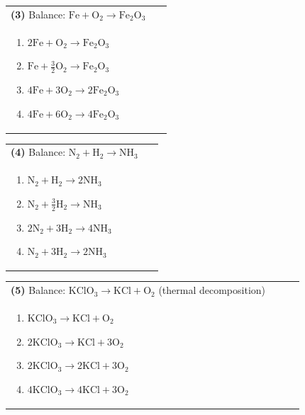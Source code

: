 \documentclass{article}
\begin{document}
\vspace{0.2cm}
\noindent \begin{tabular}{|p{0.9\linewidth}|}
\hline
\vspace{0.2cm}
\textbf{(3)} Balance: \(\mathrm{Fe + O_2 \rightarrow Fe_2O_3}\)\\
\begin{minipage}[t]{0.85\linewidth}
\begin{enumerate}[label=\alph*.]
   \item \(\mathrm{2Fe + O_2 \rightarrow Fe_2O_3}\)
   \item \(\mathrm{Fe + \tfrac{3}{2}O_2 \rightarrow Fe_2O_3}\)
   \item \(\mathrm{4Fe + 3O_2 \rightarrow 2Fe_2O_3}\)
   \item \(\mathrm{4Fe + 6O_2 \rightarrow 4Fe_2O_3}\)
\end{enumerate}
\end{minipage}\\
\hline
\end{tabular}

\vspace{0.2cm}
\noindent \begin{tabular}{|p{0.9\linewidth}|}
\hline
\vspace{0.2cm}
\textbf{(4)} Balance: \(\mathrm{N_2 + H_2 \rightarrow NH_3}\)\\
\begin{minipage}[t]{0.85\linewidth}
\begin{enumerate}[label=\alph*.]
   \item \(\mathrm{N_2 + H_2 \rightarrow 2NH_3}\)
   \item \(\mathrm{N_2 + \tfrac{3}{2}H_2 \rightarrow NH_3}\)
   \item \(\mathrm{2N_2 + 3H_2 \rightarrow 4NH_3}\)
   \item \(\mathrm{N_2 + 3H_2 \rightarrow 2NH_3}\)
\end{enumerate}
\end{minipage}\\
\hline
\end{tabular}
\newpage

\vspace{0.2cm}
\noindent \begin{tabular}{|p{0.9\linewidth}|}
\hline
\vspace{0.2cm}
\textbf{(5)} Balance: \(\mathrm{KClO_3 \rightarrow KCl + O_2}\) (thermal decomposition)\\
\begin{minipage}[t]{0.85\linewidth}
\begin{enumerate}[label=\alph*.]
   \item \(\mathrm{KClO_3 \rightarrow KCl + O_2}\)
   \item \(\mathrm{2KClO_3 \rightarrow KCl + 3O_2}\)
   \item \(\mathrm{2KClO_3 \rightarrow 2KCl + 3O_2}\)
   \item \(\mathrm{4KClO_3 \rightarrow 4KCl + 3O_2}\)
\end{enumerate}
\end{minipage}\\
\hline
\end{tabular}
\end{document}
